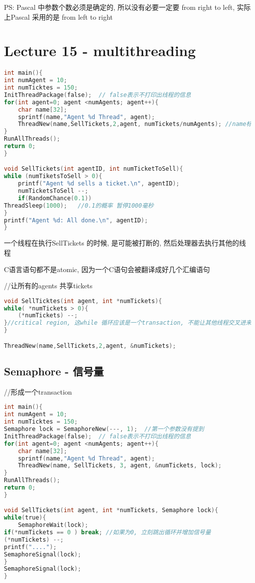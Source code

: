 \documentclass{article}
\begin{document}
PS: Pascal 中参数个数必须是确定的, 所以没有必要一定要 from right to left, 实际上Pascal 采用的是 from left to right

\section{Lecture 15 - multithreading}
\begin{lstlisting}[language = C]
int main(){
int numAgent = 10;
int numTicktes = 150;
InitThreadPackage(false);  // false表示不打印出线程的信息
for(int agent=0; agent <numAgents; agent++){
	char name[32];
	sprintf(name,"Agent %d Thread", agent);
	ThreadNew(name,SellTickets,2,agent, numTickets/numAgents); //name标记不同的线程
}
RunAllThreads();
return 0;
}

void SellTickets(int agentID, int numTicketToSell){
while (numTiketsToSell > 0){
	printf("Agent %d sells a ticket.\n", agentID);
	numTicketsToSell --;
	if(RandomChance(0.1))
ThreadSleep(1000);	 //0.1的概率 暂停1000毫秒
}
printf("Agent %d: All done.\n", agentID);
}
\end{lstlisting}
一个线程在执行SellTickets 的时候, 是可能被打断的, 然后处理器去执行其他的线程

C语言语句都不是atomic, 因为一个C语句会被翻译成好几个汇编语句

//让所有的agents 共享tickets
\begin{lstlisting}[language = C]
void SellTicktes(int agent, int *numTickets){
while( *numTickets > 0){
	(*numTickets) --;
}//critical region, 这while 循环应该是一个transaction, 不能让其他线程交叉进来
}

ThreadNew(name,SellTickets,2,agent, &numTickets);
\end{lstlisting}

\subsection{Semaphore - 信号量}
//形成一个transaction
\begin{lstlisting}[language = C]
int main(){
int numAgent = 10;
int numTicktes = 150;
Semaphore lock = SemaphoreNew(---, 1);  //第一个参数没有提到
InitThreadPackage(false);  // false表示不打印出线程的信息
for(int agent=0; agent <numAgents; agent++){
	char name[32];
	sprintf(name,"Agent %d Thread", agent);
	ThreadNew(name, SellTickets, 3, agent, &numTickets, lock);
}
RunAllThreads();
return 0;
}

void SellTickets(int agent, int *numTickets, Semaphore lock){
while(true){
	SemaphoreWait(lock);
if(*numTickets == 0 ) break; //如果为0, 立刻跳出循环并增加信号量
(*numTickets) --;
printf("....");
SemaphoreSignal(lock);
}
SemaphoreSignal(lock);
}
\end{lstlisting}
\end{document}
